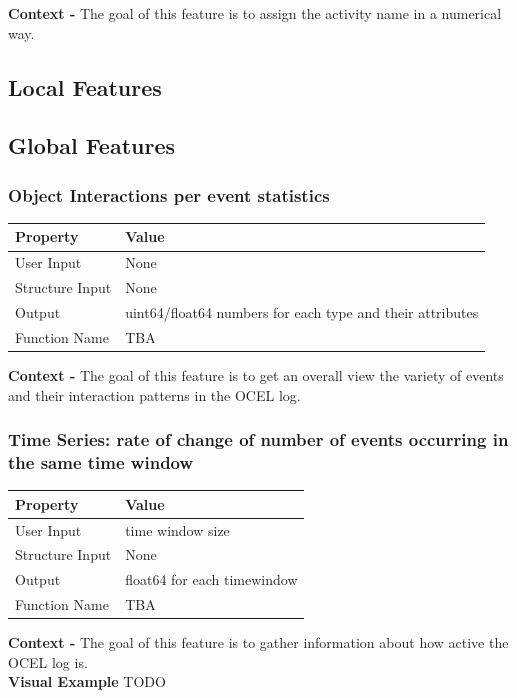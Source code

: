 \documentclass{article}
\begin{document}
\textbf{Context -} The goal of this feature is to assign the activity name in a numerical way.
\\

\subsection{Local Features}
\subsection{Global Features}

\subsubsection{Object Interactions per event statistics}
\begin{center}
	\begin{tabular}{| p{3cm} p{7cm} |}
		\hline
		\textbf{Property} & \textbf{Value}\\
		\hline
		User Input & None\\
		Structure Input & None\\
		Output & uint64/float64 numbers for each type and their attributes\\
		Function Name & TBA\\
		\hline
	\end{tabular}
\end{center}

\textbf{Context -} The goal of this feature is to get an overall view the variety of events and their interaction patterns in the OCEL log. 
\\

\subsubsection{Time Series: rate of change of number of events occurring in the same time window}
\begin{center}
	\begin{tabular}{| p{3cm} p{7cm} |}
		\hline
		\textbf{Property} & \textbf{Value}\\
		\hline
		User Input & time window size\\
		Structure Input & None\\
		Output & float64 for each timewindow\\
		Function Name & TBA\\
		\hline
	\end{tabular}
\end{center}

\textbf{Context -} The goal of this feature is to gather information about how active the OCEL log is.
\\

\textbf{Visual Example}
TODO
\end{document}
